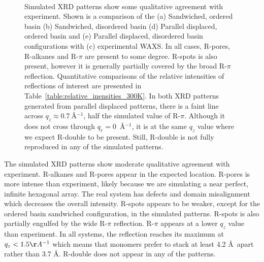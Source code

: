\documentclass[journal=jpcbfk,manuscript=article]{achemso}
\begin{document}
\begin{figure}[!htb]
\begin{subfigure}{0.1\textwidth}
	\end{subfigure}	
	\caption{Simulated XRD patterns show some qualitative agreement with experiment. Shown is a 
	comparison of the (a) Sandwiched, ordered basin (b) Sandwiched,
	disordered basin (d) Parallel displaced, ordered basin and (e) Parallel displaced, disordered basin 
	configurations with (c) experimental WAXS. 	In all cases, R-pores, R-alkanes and R-$\pi$ are 
	present to some degree. R-spots is also present, however it is generally partially covered by the
	broad R-$\pi$ reflection. Quantitative comparisons of the relative intensities of reflections of
	interest are presented in Table~\ref{table:relative_inensities_300K}. In both XRD patterns generated
	from parallel displaced patterns, there is a faint line across $q_z \approx 0.7~$\AA$^{-1}$, half
	the simulated value of R-$\pi$. Although it does not cross through $q_r = 0$~\AA$^{-1}$, it is at 
	the same $q_z$ value where we expect R-double to be present. Still, R-double is not fully reproduced
	in any of the simulated patterns.}~\label{fig:XRDsim} 
  \end{figure}
  
  The simulated XRD patterns show moderate qualitative agreement with experiment. R-alkanes and
  R-pores appear in the expected location. R-pores is more intense than experiment, likely
  because we are simulating a near perfect, infinite hexagonal array. The real system has 
  defects and domain misalignment which decreases the overall intensity.
  R-spots appears to be weaker, except for the ordered basin sandwiched configuration, in the 
  simulated patterns. R-spots is also partially engulfed by the wide R-$\pi$ reflection. R-$\pi$
  appears at a lower $q_z$ value than experiment. In all systems, the reflection reaches its 
  maximum at $q_z < 1.5 \AA^{-1}$ which means that monomers prefer to stack at least 4.2 \AA~apart
  rather than 3.7 \AA. R-double does not appear in any of the patterns. 
  
  
\end{document}
